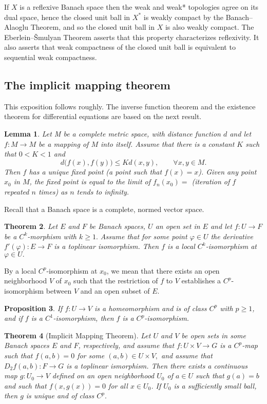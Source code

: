 \documentclass[a5paper,10pt,twoside]{article}
\theoremstyle{plain}
\newtheorem{teo}{Theorem}[section]
\newtheorem{prop}[teo]{Proposition}
\newtheorem{lem}[teo]{Lemma}
\theoremstyle{definition}
\theoremstyle{remark}
\begin{document}
If $X$ is a reflexive Banach space then the weak and weak* topologies agree on its dual space, hence the closed unit ball in $X^*$ is weakly compact by the Banach–Alaoglu Theorem, and so the closed unit ball in $X$ is also weakly compact.  The Eberlein–Šmulyan Theorem asserts that this property characterizes reflexivity.  It also asserts that weak compactness of the closed unit ball is equivalent to sequential weak compactness.

\subsection{The implicit mapping theorem}
This exposition follows \cite{lang1999} roughly. The inverse function theorem and the existence theorem for differential equations are based on the next result.

\begin{lem}
	Let M be a complete metric space, with distance function $d$ and let $f:M\to M$ be a mapping of $M$ into itself. Assume that there is a constant $K$ such that $0<K<1$ and
	\[
	d\big(f(x),f(y)\big)\leq K d(x,y),\qquad\forall x,y\in M.
	\]
	Then $f$ has a unique fixed point (a point such that $f(x) = x$). Given any
	point $x_0$ in $M$, the fixed point is equal to the limit of $f_n(x_0)=$ (iteration of $f$ repeated $n$ times) as $n$ tends to infinity.
\end{lem}

Recall that a Banach space is a complete, normed vector space.

\begin{teo}
	\label{teo:Cpmorphism}
	Let $E$ and $F$ be Banach spaces, $U$ an open set in $E$ and let
	$f:U\to F$ be a $C^{k}$-morphism with $k\geq1.$ Assume that for
	some point $\varphi\in U$ the derivative $f'(\varphi):E\to F$ is
	a toplinear isomorphism. Then $f$ is a local $C^{k}$-isomorphism
	at $\varphi\in U.$
\end{teo}

By a local $C^p$-isomorphism at $x_0$, we mean that there exists an open
neighborhood $V$ of $x_0$ such that the restriction of $f$ to $V$ establishes a
$C^p$-isomorphism between $V$ and an open subset of $E.$

\begin{prop}
	If $f: U\to V$ is a homeomorphism and is of class $C^p$ with $p\geq1$, and if $f$ is a $C^1$-isomorphism, then $f$ is a $C^p$-isomorphism.
\end{prop}


\begin{teo}[Implicit Mapping Theorem]
	Let $U$ and $V$ be open sets in some Banach spaces $E$ and $F$, respectively, and assume that $f:U\times V\to G$ is a $C^p$-map such that $f(a,b)=0$ for some $(a,b)\in U\times V,$ and assume that $D_2f(a,b): F\to G$ is a toplinear ismorphism. Then there exists a continuous map $g: U_0\to V$ defined on an open neighborhood $U_0$ of $a\in U$ such that $g(a) = b$ and such that $f(x,g(x))=0$ for all $x\in U_0$. If $U_0$ is a sufficiently small ball, then $g$ is unique and of class $C^p.$
\end{teo}
\end{document}
